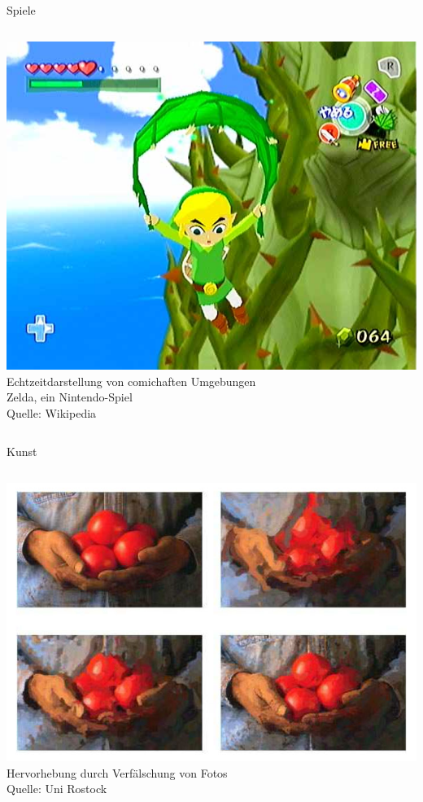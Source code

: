 \begin{frame}{Spiele}
  \begin{columns}
	\includegraphics[width=\textwidth]{../images/Zelda.jpg}
	Echtzeitdarstellung von comichaften Umgebungen\\
	Zelda, ein Nintendo-Spiel\\
	Quelle: Wikipedia
  \end{columns}
\end{frame}

\begin{frame}{Kunst}
  \begin{columns}
	\includegraphics[width=\textwidth]{../images/kunscht.jpg}
	Hervorhebung durch Verfälschung von Fotos\\
	Quelle: Uni Rostock
  \end{columns}
\end{frame}

